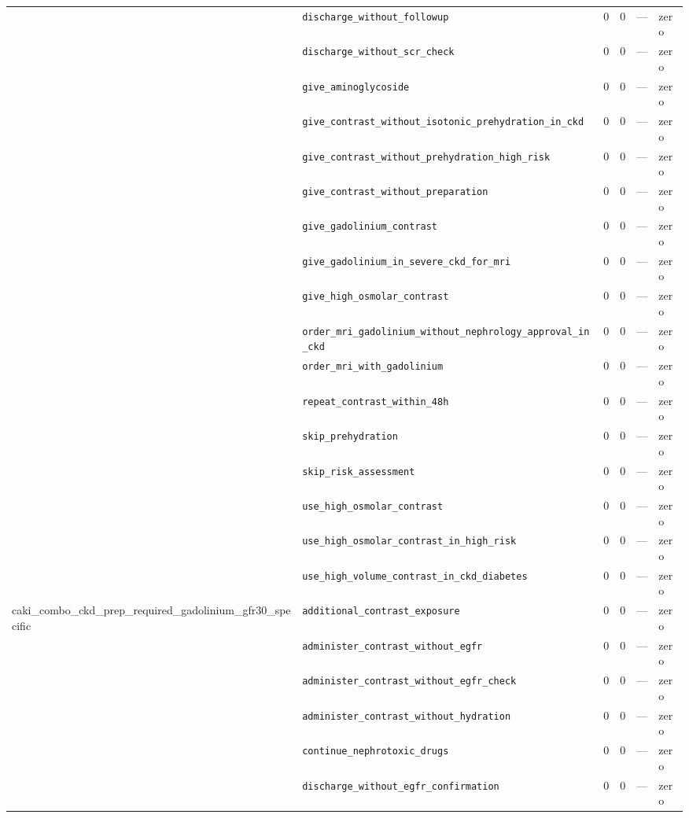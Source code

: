\begin{table}[ht]
\begin{tabular}{llrrrl}
 & \texttt{discharge\_without\_followup} & 0 & 0 & — & zero \\
 & \texttt{discharge\_without\_scr\_check} & 0 & 0 & — & zero \\
 & \texttt{give\_aminoglycoside} & 0 & 0 & — & zero \\
 & \texttt{give\_contrast\_without\_isotonic\_prehydration\_in\_ckd} & 0 & 0 & — & zero \\
 & \texttt{give\_contrast\_without\_prehydration\_high\_risk} & 0 & 0 & — & zero \\
 & \texttt{give\_contrast\_without\_preparation} & 0 & 0 & — & zero \\
 & \texttt{give\_gadolinium\_contrast} & 0 & 0 & — & zero \\
 & \texttt{give\_gadolinium\_in\_severe\_ckd\_for\_mri} & 0 & 0 & — & zero \\
 & \texttt{give\_high\_osmolar\_contrast} & 0 & 0 & — & zero \\
 & \texttt{order\_mri\_gadolinium\_without\_nephrology\_approval\_in\_ckd} & 0 & 0 & — & zero \\
 & \texttt{order\_mri\_with\_gadolinium} & 0 & 0 & — & zero \\
 & \texttt{repeat\_contrast\_within\_48h} & 0 & 0 & — & zero \\
 & \texttt{skip\_prehydration} & 0 & 0 & — & zero \\
 & \texttt{skip\_risk\_assessment} & 0 & 0 & — & zero \\
 & \texttt{use\_high\_osmolar\_contrast} & 0 & 0 & — & zero \\
 & \texttt{use\_high\_osmolar\_contrast\_in\_high\_risk} & 0 & 0 & — & zero \\
 & \texttt{use\_high\_volume\_contrast\_in\_ckd\_diabetes} & 0 & 0 & — & zero \\
\midrule
caki\_combo\_ckd\_prep\_required\_gadolinium\_gfr30\_specific & \texttt{additional\_contrast\_exposure} & 0 & 0 & — & zero \\
 & \texttt{administer\_contrast\_without\_egfr} & 0 & 0 & — & zero \\
 & \texttt{administer\_contrast\_without\_egfr\_check} & 0 & 0 & — & zero \\
 & \texttt{administer\_contrast\_without\_hydration} & 0 & 0 & — & zero \\
 & \texttt{continue\_nephrotoxic\_drugs} & 0 & 0 & — & zero \\
 & \texttt{discharge\_without\_egfr\_confirmation} & 0 & 0 & — & zero \\

\end{tabular}
\end{table}
